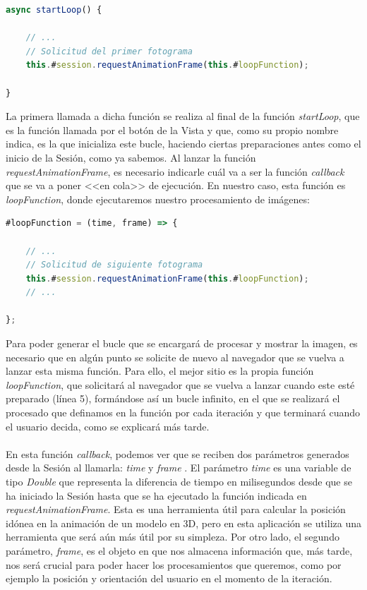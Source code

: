 \documentclass{subfiles}
\begin{document}
\begin{lstlisting}[language=JavaScript]
async startLoop() {

    // ...
    // Solicitud del primer fotograma
    this.#session.requestAnimationFrame(this.#loopFunction);
    
}
\end{lstlisting}

        La primera llamada a dicha función se realiza al final de la función \textit{startLoop}, que es la función llamada por el botón de la Vista y que, como su propio nombre indica, es la que inicializa este bucle, haciendo ciertas preparaciones antes como el inicio de la Sesión, como ya sabemos. Al lanzar la función \textit{requestAnimationFrame}, es necesario indicarle cuál va a ser la función \textit{callback} que se va a poner <<en cola>> de ejecución. En nuestro caso, esta función es \textit{loopFunction}, donde ejecutaremos nuestro procesamiento de imágenes:

\begin{lstlisting}[language=JavaScript]
#loopFunction = (time, frame) => {

    // ...
    // Solicitud de siguiente fotograma
    this.#session.requestAnimationFrame(this.#loopFunction);
    // ...
    
};
\end{lstlisting}

        Para poder generar el bucle que se encargará de procesar y mostrar la imagen, es necesario que en algún punto se solicite de nuevo al navegador que se vuelva a lanzar esta misma función. Para ello, el mejor sitio es la propia función \textit{loopFunction}, que solicitará al navegador que se vuelva a lanzar cuando este esté preparado (línea 5), formándose así un bucle infinito, en el que se realizará el procesado que definamos en la función por cada iteración y que terminará cuando el usuario decida, como se explicará más tarde.

        \paragraph{}
        En esta función \textit{callback}, podemos ver que se reciben dos parámetros generados desde la Sesión al llamarla: \textit{time} y \textit{frame} \cite{web:requestanimationframe}. El parámetro \textit{time} es una variable de tipo \textit{Double} que representa la diferencia de tiempo en milisegundos desde que se ha iniciado la Sesión hasta que se ha ejecutado la función indicada en \textit{requestAnimationFrame}. Esta es una herramienta útil para calcular la posición idónea en la animación de un modelo en 3D, pero en esta aplicación se utiliza una herramienta que será aún más útil por su simpleza. Por otro lado, el segundo parámetro, \textit{frame}, es el objeto en que \webxr nos almacena información que, más tarde, nos será crucial para poder hacer los procesamientos que queremos, como por ejemplo la posición y orientación del usuario en el momento de la iteración.
\end{document}
